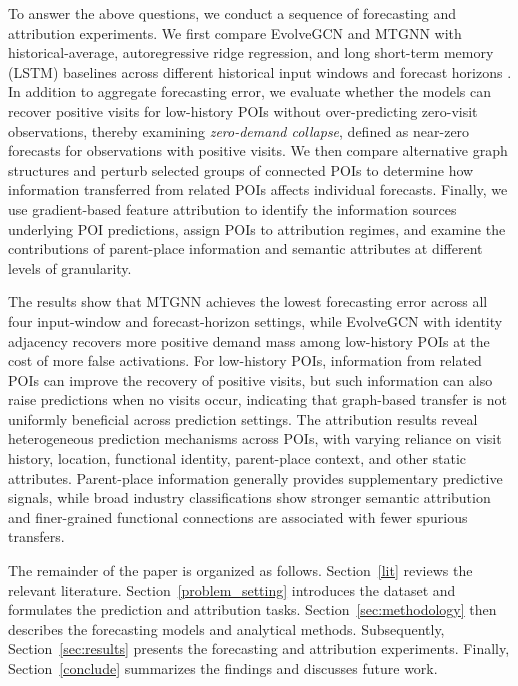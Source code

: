 \documentclass[preprint,authoryear,11pt]{elsarticle}
\def\citep#1{}%
\theoremstyle{definition}
\begin{document}
To answer the above questions, we conduct a sequence of forecasting and attribution experiments. 
We first compare EvolveGCN and MTGNN with historical-average, autoregressive ridge regression, and long short-term memory (LSTM) baselines across different historical input windows and forecast horizons \citep{hochreiter1997long}. 
In addition to aggregate forecasting error, we evaluate whether the models can recover positive visits for low-history POIs without over-predicting zero-visit observations, thereby examining \textit{zero-demand collapse}, defined as near-zero forecasts for observations with positive visits.
We then compare alternative graph structures and perturb selected groups of connected POIs to determine how information transferred from related POIs affects individual forecasts. 
Finally, we use gradient-based feature attribution to identify the information sources underlying POI predictions, assign POIs to attribution regimes, and examine the contributions of parent-place information and semantic attributes at different levels of granularity.


The results show that MTGNN achieves the lowest forecasting error across all four input-window and forecast-horizon settings, while EvolveGCN with identity adjacency recovers more positive demand mass among low-history POIs at the cost of more false activations.
For low-history POIs, information from related POIs can improve the recovery of positive visits, but such information can also raise predictions when no visits occur, indicating that graph-based transfer is not uniformly beneficial across prediction settings.
The attribution results reveal heterogeneous prediction mechanisms across POIs, with varying reliance on visit history, location, functional identity, parent-place context, and other static attributes.
Parent-place information generally provides supplementary predictive signals, while broad industry classifications show stronger semantic attribution and finer-grained functional connections are associated with fewer spurious transfers.


The remainder of the paper is organized as follows.
Section~\ref{lit} reviews the relevant literature.
Section~\ref{problem_setting} introduces the dataset and formulates the prediction and attribution tasks.
Section~\ref{sec:methodology} then describes the forecasting models and analytical methods.
Subsequently, Section~\ref{sec:results} presents the forecasting and attribution experiments.
Finally, Section~\ref{conclude} summarizes the findings and discusses future work.
\end{document}
